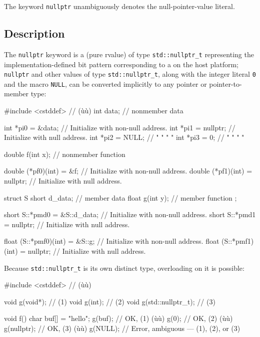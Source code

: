 The keyword \lstinline!nullptr! unambiguously denotes the
null-pointer-value literal.

\subsection[Description]{Description}\label{description}

The \lstinline!nullptr! keyword is a  (pure rvalue) of type
\lstinline!std::nullptr_t! representing the implementation-defined
bit pattern corresponding to a  on the host platform;
\lstinline!nullptr! and other values of type \lstinline!std::nullptr_t!, along with the integer literal \lstinline!0! and the macro \lstinline!NULL!, can be converted implicitly to any pointer or pointer-to-member type:

\begin{emcppslisting}
#include <cstddef> // (ù{}ù)
int data;  // nonmember data

int *pi0 = &data;    // Initialize with non-null address.
int *pi1 = nullptr;  // Initialize with null address.
int *pi2 = NULL;     //  "          "    "    "
int *pi3 = 0;        //  "          "    "    "

double f(int x);  // nonmember function

double (*pf0)(int) = &f;       // Initialize with non-null address.
double (*pf1)(int) = nullptr;  // Initialize with null address.

struct S
{
    short d_data;    // member data
    float g(int y);  // member function
};

short S::*pmd0 = &S::d_data;  // Initialize with non-null address.
short S::*pmd1 = nullptr;     // Initialize with null address.

float (S::*pmf0)(int) = &S::g;    // Initialize with non-null address.
float (S::*pmf1)(int) = nullptr;  // Initialize with null address.
\end{emcppslisting}


\noindent Because \lstinline!std::nullptr_t! is its own distinct type, overloading on
it is possible:

\begin{emcppslisting}
#include <cstddef>  // (ù{}ù)

void g(void*);           // (1)
void g(int);             // (2)
void g(std::nullptr_t);  // (3)

void f()
{
    char buf[] = "hello";
    g(buf);      // OK, (1) (ù{}ù)
    g(0);        // OK, (2) (ù{}ù)
    g(nullptr);  // OK, (3) (ù{}ù)
    g(NULL);     // Error, ambiguous --- (1), (2), or (3)
}
\end{emcppslisting}


